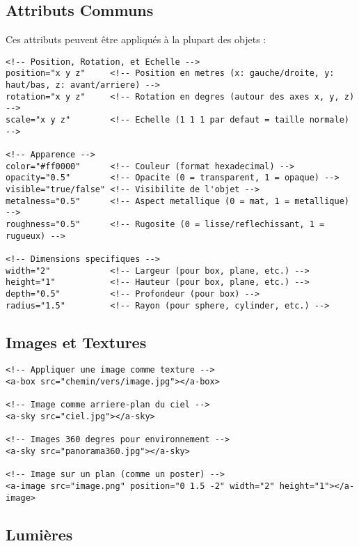 \documentclass[12pt]{article}
\begin{document}
\subsection{Attributs Communs}

Ces attributs peuvent être appliqués à la plupart des objets :

\begin{verbatim}
<!-- Position, Rotation, et Echelle -->
position="x y z"     <!-- Position en metres (x: gauche/droite, y: haut/bas, z: avant/arriere) -->
rotation="x y z"     <!-- Rotation en degres (autour des axes x, y, z) -->
scale="x y z"        <!-- Echelle (1 1 1 par defaut = taille normale) -->

<!-- Apparence -->
color="#ff0000"      <!-- Couleur (format hexadecimal) -->
opacity="0.5"        <!-- Opacite (0 = transparent, 1 = opaque) -->
visible="true/false" <!-- Visibilite de l'objet -->
metalness="0.5"      <!-- Aspect metallique (0 = mat, 1 = metallique) -->
roughness="0.5"      <!-- Rugosite (0 = lisse/reflechissant, 1 = rugueux) -->

<!-- Dimensions specifiques -->
width="2"            <!-- Largeur (pour box, plane, etc.) -->
height="1"           <!-- Hauteur (pour box, plane, etc.) -->
depth="0.5"          <!-- Profondeur (pour box) -->
radius="1.5"         <!-- Rayon (pour sphere, cylinder, etc.) -->
\end{verbatim}

\subsection{Images et Textures}

\begin{verbatim}
<!-- Appliquer une image comme texture -->
<a-box src="chemin/vers/image.jpg"></a-box>

<!-- Image comme arriere-plan du ciel -->
<a-sky src="ciel.jpg"></a-sky>

<!-- Images 360 degres pour environnement -->
<a-sky src="panorama360.jpg"></a-sky>

<!-- Image sur un plan (comme un poster) -->
<a-image src="image.png" position="0 1.5 -2" width="2" height="1"></a-image>
\end{verbatim}

\subsection{Lumières}
\end{document}
